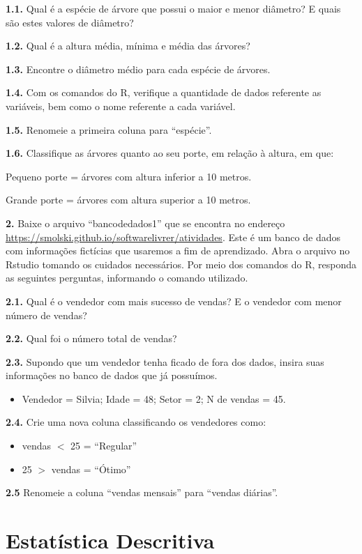 \documentclass[12pt,brazil,oneside]{book}
\providecommand{\tightlist}{%
  \setlength{\itemsep}{0pt}\setlength{\parskip}{0pt}}
\begin{document}
\textbf{1.1.} Qual é a espécie de árvore que possui o maior e menor
diâmetro? E quais são estes valores de diâmetro?

\textbf{1.2.} Qual é a altura média, mínima e média das árvores?

\textbf{1.3.} Encontre o diâmetro médio para cada espécie de árvores.

\textbf{1.4.} Com os comandos do R, verifique a quantidade de dados
referente as variáveis, bem como o nome referente a cada variável.

\textbf{1.5.} Renomeie a primeira coluna para ``espécie''.

\textbf{1.6.} Classifique as árvores quanto ao seu porte, em relação à
altura, em que:

Pequeno porte = árvores com altura inferior a 10 metros.

Grande porte = árvores com altura superior a 10 metros.

\textbf{2.} Baixe o arquivo ``bancodedados1'' que se encontra no
endereço \url{https://smolski.github.io/softwarelivrer/atividades}. Este
é um banco de dados com informações fictícias que usaremos a fim de
aprendizado. Abra o arquivo no Rstudio tomando os cuidados necessários.
Por meio dos comandos do R, responda as seguintes perguntas, informando
o comando utilizado.

\textbf{2.1.} Qual é o vendedor com mais sucesso de vendas? E o vendedor
com menor número de vendas?

\textbf{2.2.} Qual foi o número total de vendas?

\textbf{2.3.} Supondo que um vendedor tenha ficado de fora dos dados,
insira suas informações no banco de dados que já possuímos.

\begin{itemize}
\tightlist
\item
  Vendedor = Silvia; Idade = 48; Setor = 2; N de vendas = 45.
\end{itemize}

\textbf{2.4.} Crie uma nova coluna classificando os vendedores como:

\begin{itemize}
\item
  vendas \(<\) 25 = ``Regular''
\item
  25 \(>\) vendas = ``Ótimo''
\end{itemize}

\textbf{2.5} Renomeie a coluna ``vendas mensais'' para ``vendas
diárias''.

\hypertarget{desc}{%
\chapter{Estatística Descritiva}\label{desc}}
\end{document}
